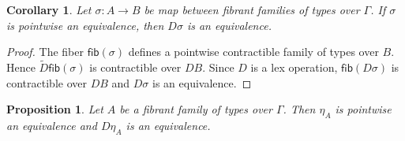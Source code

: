 \documentclass[10pt,a4paper,draft]{article}
\newcommand{\hFiber}{\mathsf{fib}}
\newcommand{\D}{D}              %
\newcommand{\DD}{\tilde{D}} %
\renewcommand{\~}{\widetilde}
\newtheorem{corollary}[theorem]{Corollary}
\newtheorem{proposition}[theorem]{Proposition}
\theoremstyle{definition}
\theoremstyle{remark} %
\begin{document}
\begin{corollary}\label{Dequiv}
Let $\sigma : A \to B$ be map between fibrant families of types over $\Gamma$.
If $\sigma$ is pointwise an equivalence, then $\D\sigma$ is an equivalence.
\end{corollary}

\begin{proof}
  The fiber $\hFiber(\sigma)$ defines a pointwise contractible family
  of types over $B$. Hence $\DD \hFiber(\sigma)$ is contractible over $\D B$.
  Since $\D$ is a lex operation,  $\hFiber(\D\sigma)$ is contractible over $\D B$
  and $\D\sigma$ is an equivalence.
\end{proof}

\begin{proposition}\label{key1}
Let $A$ be a fibrant family of types over $\Gamma$.
Then $\eta_A$ is pointwise an equivalence and $\D\eta_A$ is an equivalence.
\end{proposition}
\end{document}
